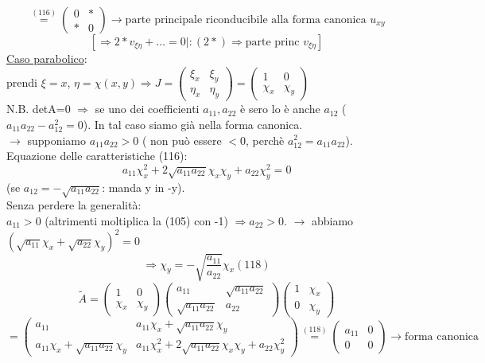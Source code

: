 \documentclass[a4paper,11pt]{report}
\begin{document}
$$
\overset{(116)}{=}\left(\begin{matrix}
0 & *\\
* & 0
\end{matrix}\right) \rightarrow \text{parte principale riconducibile alla forma canonica $u_{xy}$}
$$
$$
[\Rightarrow 2 * v_{\xi\eta} + \dots =0|: (2*) \Rightarrow \text{parte princ }v_{\xi\eta} ]
$$
\underline{Caso parabolico}: \\
prendi $\xi=x$, $\eta=\chi(x,y) \Rightarrow J=\left(\begin{matrix}
\xi_x & \xi_y \\
\eta_x & \eta_y
\end{matrix}\right)=\left( \begin{matrix}
1 & 0\\
\chi_{x} & \chi_y
\end{matrix}\right)$\\
N.B. detA=0 $\Rightarrow$ se uno dei coefficienti $a_{11}, a_{22}$ è sero lo è anche $a_{12}$ ($a_{11}a_{22}-a_{12}^2=0$). In tal caso siamo già nella forma canonica.\\
$\rightarrow $ supponiamo $a_{11}a_{22}>0$ ( non può essere $<0$, perchè $a_{12}^2 = a_{11}a_{22}$).\\
Equazione delle caratteristiche (116):
$$
a_{11}\chi_x^2+2\sqrt{a_{11}a_{22}}\chi_x\chi_y + a_{22}\chi_y^2 =0
$$
(se $a_{12}=-\sqrt{a_{11}a_{22}}$: manda y in -y).\\
Senza perdere la generalità:\\
$a_{11}>0$ (altrimenti moltiplica la (105) con -1) $\Rightarrow a_{22}>0$. $\rightarrow$ abbiamo $(\sqrt{a_{11}}\chi_x + \sqrt{a_{22}}\chi_y)^2=0$
\begin{equation}
\Rightarrow\chi_y = - \sqrt{\dfrac{a_{11}}{a_{22}}}\chi_x (118)
\end{equation}
$$
\tilde{A}=\left(\begin{matrix}
1 & 0\\
\chi_x & \chi_y
\end{matrix}\right)\left(\begin{matrix}
a_11 & \sqrt{a_{11}a_{22}}\\
\sqrt{a_{11}a_{22}} & a_22
\end{matrix}\right)\left(\begin{matrix}
1 & \chi_x \\
0 & \chi_y
\end{matrix}\right)
$$
$$
=\left(\begin{matrix}
a_{11} & a_{11}\chi_x + \sqrt{a_{11}a_{22}}\chi_y \\
a_{11}\chi_x + \sqrt{a_{11}a_{22}}\chi_y & a_{11}\chi_x^2 + 2\sqrt{a_{11}a_{22}}\chi_x\chi_y + a_{22}\chi_y^2
\end{matrix}\right)\overset{(118)}{=}\left(\begin{matrix}
a_{11} & 0\\
0 & 0
\end{matrix}\right) \rightarrow \text{forma canonica}
$$
\end{document}

